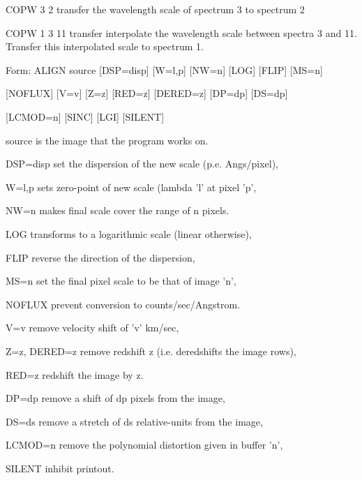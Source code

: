 {\newpage\clearpage
{}%
\begin{example}
  \item[COPW 3 2\hfill]{transfer the wavelength scale of spectrum 3 to
       spectrum 2}
\par\item[COPW 1 3 11\hfill]{transfer interpolate the wavelength scale
       between spectra 3 and 11.  Transfer this interpolated scale to
       spectrum 1.}
\end{example}%
\lthtmlfigureZ
\lthtmlcheckvsize\clearpage}

{\newpage\clearpage
{}%
\begin{command}
  \item[Form: ALIGN source {[DSP=disp]} {[W=l,p]} {[NW=n]} {[LOG]} 
       {[FLIP]} {[MS=n]}\hfill]{}
  \item{{[NOFLUX]} {[V=v]} {[Z=z]} {[RED=z]} {[DERED=z]} {[DP=dp]} {[DS=dp]}}
  \item{{[LCMOD=n]} {[SINC]} {[LGI]} {[SILENT]}}
  \item[source]{is the image that the program works on.}
  \item[DSP=disp]{set the dispersion of the new scale (p.e. Angs/pixel),}
  \item[W=l,p]{sets zero-point of new scale (lambda 'l' at pixel 'p',}
  \item[NW=n]{makes final scale cover the range of n pixels.}
  \item[LOG]{transforms to a logarithmic scale (linear otherwise),}
  \item[FLIP]{reverse the direction of the dispersion,}
  \item[MS=n]{set the final pixel scale to be that of image 'n',}
  \item[NOFLUX]{prevent conversion to counts/sec/Angstrom.}
  \item[V=v]{remove velocity shift of 'v' km/sec,}
  \item[Z=z, DERED=z]{remove redshift z (i.e. deredshifts the image rows),}
  \item[RED=z]{redshift the image by z.}
  \item[DP=dp]{remove a shift of dp pixels from the image,}
  \item[DS=ds]{remove a stretch of ds relative-units from the image,}
  \item[LCMOD=n]{remove the polynomial distortion given in buffer 'n',}
  \item[SILENT]{inhibit printout.}
\end{command}%
\lthtmlfigureZ
\lthtmlcheckvsize\clearpage}

